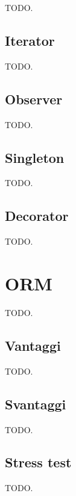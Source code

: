 \documentclass{article}
\begin{document}
TODO.

\subsection{Iterator}

TODO.

\subsection{Observer}

TODO.

\subsection{Singleton}

TODO.

\subsection{Decorator}

TODO.

\section{ORM}

TODO.

\subsection{Vantaggi}

TODO.

\subsection{Svantaggi}

TODO.

\subsection{Stress test}

TODO.

\begin{appendix}
    \listoffigures
\end{appendix}
\end{document}
